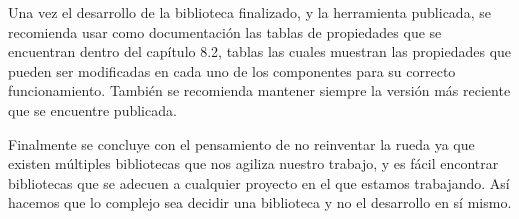 Una vez el desarrollo de la biblioteca finalizado, y la herramienta publicada, se recomienda usar como documentación las tablas de propiedades que se encuentran dentro del capítulo 8.2, tablas las cuales muestran las propiedades que pueden ser modificadas en cada uno de los componentes para su correcto funcionamiento.
También se recomienda mantener siempre la versión más reciente que se encuentre publicada.

Finalmente se concluye con el pensamiento de no reinventar la rueda ya que existen múltiples bibliotecas que nos agiliza nuestro trabajo, y es fácil encontrar bibliotecas que se adecuen a cualquier proyecto en el que estamos trabajando. Así hacemos que lo complejo sea decidir una biblioteca y no el desarrollo en sí mismo.
